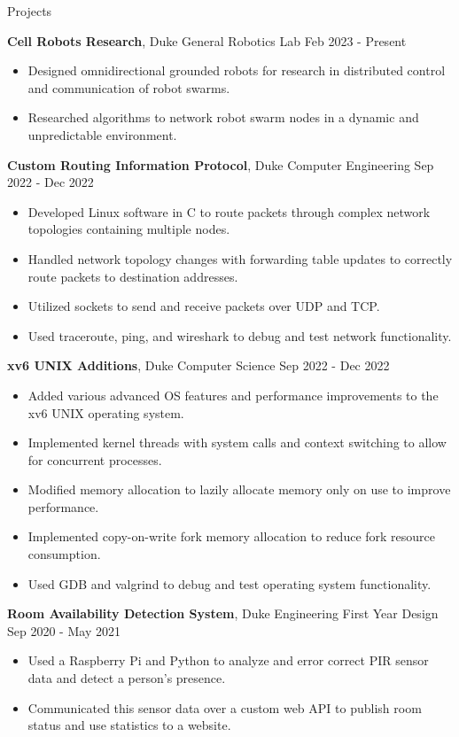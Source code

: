 \documentclass{resume}
\begin{document}
\begin{rSection}{Projects}

\textbf{Cell Robots Research}, Duke General Robotics Lab \hfill{Feb 2023 - Present}
\begin{itemize}
    \item Designed omnidirectional grounded robots for research in distributed control and communication of robot swarms.
    \item Researched algorithms to network robot swarm nodes in a dynamic and unpredictable environment.
\end{itemize}

\textbf{Custom Routing Information Protocol}, Duke Computer Engineering \hfill{Sep 2022 - Dec 2022}
\begin{itemize}
    \itemsep -3pt {} 
    \item Developed Linux software in C to route packets through complex network topologies containing multiple nodes.
    \item Handled network topology changes with forwarding table updates to correctly route packets to destination addresses.
    \item Utilized sockets to send and receive packets over UDP and TCP.
    \item Used traceroute, ping, and wireshark to debug and test network functionality.
\end{itemize}

\textbf{xv6 UNIX Additions}, Duke Computer Science \hfill{Sep 2022 - Dec 2022}
\begin{itemize}
    \itemsep -3pt {} 
    \item Added various advanced OS features and performance improvements to the xv6 UNIX operating system.
    \item Implemented kernel threads with system calls and context switching to allow for concurrent processes.
    \item Modified memory allocation to lazily allocate memory only on use to improve performance.
    \item Implemented copy-on-write fork memory allocation to reduce fork resource consumption.
    \item Used GDB and valgrind to debug and test operating system functionality.
\end{itemize}

\textbf{Room Availability Detection System}, Duke Engineering First Year Design \hfill{Sep 2020 - May 2021}
\begin{itemize}
    \itemsep -3pt {} 
    \item Used a Raspberry Pi and Python to analyze and error correct PIR sensor data and detect a person's presence.
    \item Communicated this sensor data over a custom web API to publish room status and use statistics to a website.
\end{itemize}

\end{rSection} 
\end{document}
